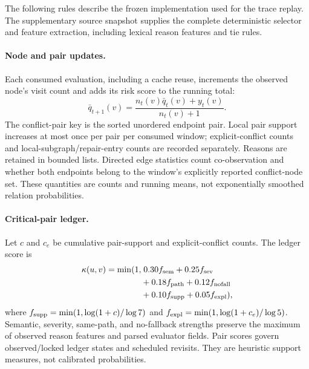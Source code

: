\begin{revadded}
The following rules describe the frozen implementation used for the trace replay. The supplementary source snapshot supplies the complete deterministic selector and feature extraction, including lexical reason features and tie rules.

\paragraph{Node and pair updates.}
Each consumed evaluation, including a cache reuse, increments the observed node's visit count and adds its risk score to the running total:
\begin{equation}
 \bar q_{t+1}(v)=\frac{n_t(v)\bar q_t(v)+y_t(v)}{n_t(v)+1}.
 \label{eq:node-update}
\end{equation}
The conflict-pair key is the sorted unordered endpoint pair. Local pair support increases at most once per pair per consumed window; explicit-conflict counts and local-subgraph/repair-entry counts are recorded separately. Reasons are retained in bounded lists. Directed edge statistics count co-observation and whether both endpoints belong to the window's explicitly reported conflict-node set. These quantities are counts and running means, not exponentially smoothed relation probabilities.

\paragraph{Critical-pair ledger.}
Let $c$ and $c_e$ be cumulative pair-support and explicit-conflict counts. The ledger score is
\begin{equation}
 \begin{aligned}
 \kappa(u,v)=\min(1,&\;0.30f_{\rm sem}+0.25f_{\rm sev}\\
 &+0.18f_{\rm path}+0.12f_{\rm nofall}\\
 &+0.10f_{\rm supp}+0.05f_{\rm expl}),
 \end{aligned}
 \label{eq:critical-pair}
\end{equation}
where $f_{\rm supp}=\min(1,\log(1+c)/\log7)$ and $f_{\rm expl}=\min(1,\log(1+c_e)/\log5)$. Semantic, severity, same-path, and no-fallback strengths preserve the maximum of observed reason features and parsed evaluator fields. Pair scores govern observed/locked ledger states and scheduled revisits. They are heuristic support measures, not calibrated probabilities.


\end{revadded}
